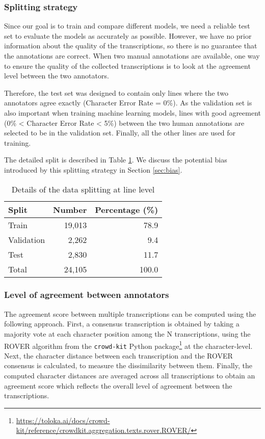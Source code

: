 \documentclass[sigconf]{acmart}
\begin{document}
\subsubsection{Splitting strategy}
\label{sec:splitting_strategy}
Since our goal is to train and compare different models, we need a reliable test set to evaluate the models as accurately as possible. However, we have no prior information about the quality of the transcriptions, so there is no guarantee that the annotations are correct. When two manual annotations are available, one way to ensure the quality of the collected transcriptions is to look at the agreement level between the two annotators.

Therefore, the test set was designed to contain only lines where the two annotators agree exactly (Character Error Rate = 0\%). As the validation set is also important when training machine learning models, lines with good agreement (0\% < Character Error Rate < 5\%) between the two human annotations are selected to be in the validation set. Finally, all the other lines are used for training. 

The detailed split is described in Table \ref{tab:split}. We discuss the potential bias introduced by this splitting strategy in Section \ref{sec:bias}.

\begin{table}[htb]
    \centering
    \caption{Details of the data splitting at line level}
    \begin{tabular}{l|rr}
    \toprule
        \bf Split & \bf Number & \bf Percentage (\%)  \\
    \midrule
        Train & 19,013 & 78.9 \\
        Validation & 2,262 & 9.4 \\
        Test & 2,830 & 11.7 \\
    \midrule
        Total & 24,105 & 100.0\\
    \bottomrule
    \end{tabular}
    \label{tab:split}
\end{table}

\subsubsection{Level of agreement between annotators}
The agreement score between multiple transcriptions can be computed using the following approach. First, a consensus transcription is obtained by taking a majority vote at each character position among the N transcriptions, using the ROVER algorithm from the \texttt{crowd-kit} Python package\footnote{\url{https://toloka.ai/docs/crowd-kit/reference/crowdkit.aggregation.texts.rover.ROVER/}} at the character-level. Next, the character distance between each transcription and the ROVER consensus is calculated, to measure the dissimilarity between them. Finally, the computed character distances are averaged across all transcriptions to obtain an agreement score which reflects the overall level of agreement between the transcriptions.
\end{document}
